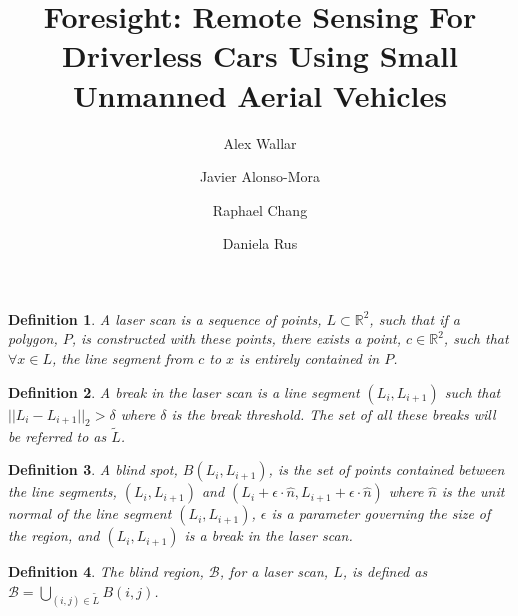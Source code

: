 \documentclass[letterpaper, 10pt, conference]{ieeeconf}
\newcommand{\R}{\ensuremath{\mathbb{R}}}
\newtheorem{definition}{Definition}
\begin{document}
\title{Foresight: Remote Sensing For Driverless Cars Using Small
Unmanned Aerial Vehicles}


\author{Alex Wallar \and Javier Alonso-Mora \and Raphael Chang
\and Daniela Rus}

\maketitle

\begin{abstract}

\end{abstract}

\begin{definition}

    A laser scan is a sequence of points, $L \subset \R^2$, such that
    if a polygon, $P$, is constructed with these points, there exists a point,
    $c \in \R^2$, such that $\forall x \in L$, the line segment from
    $c$ to $x$ is entirely contained in $P$.

\end{definition}

\begin{definition}

    A break in the laser scan is a line segment $(L_i, L_{i + 1})$ such that
    $||L_i - L_{i + 1}||_2 > \delta$ where $\delta$ is the break threshold. The
    set of all these breaks will be referred to as $\tilde L$.

\end{definition}

\begin{definition}

    A blind spot, $B(L_i, L_{i + 1})$, is the set of points contained between
    the line segments, $(L_i, L_{i + 1})$ and $(L_i + \epsilon \cdot \hat n,
    L_{i + 1} + \epsilon \cdot \hat n)$ where $\hat n$ is the unit normal of
    the line segment $(L_i, L_{i + 1})$, $\epsilon$ is a parameter governing
    the size of the region, and $(L_i, L_{i + 1})$ is a break in the laser
    scan.

\end{definition}

\begin{definition}

    The blind region, $\mathcal{B}$, for a laser scan, $L$, is defined as
    $\mathcal{B} = \bigcup_{(i, j) \in \tilde L} B(i, j)$.

\end{definition}
\end{document}
